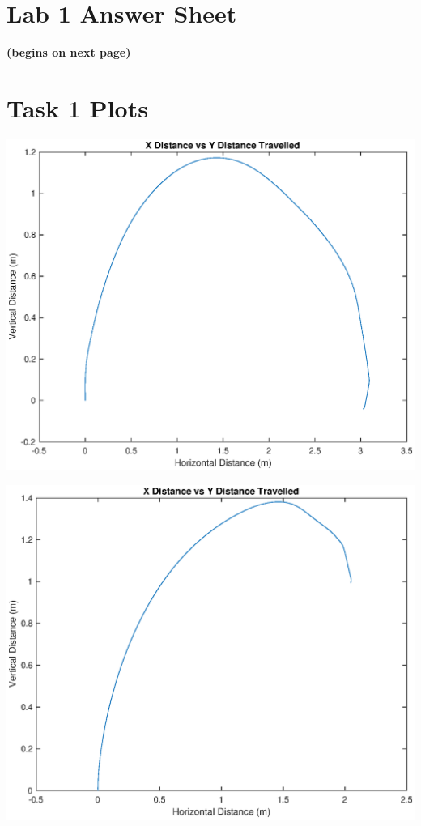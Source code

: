 \documentclass[10pt]{article}
\newcommand{\bigScale}{0.6}
\begin{document}
\pagebreak
\section{Lab 1 Answer Sheet}
\textbf{(begins on next page)}


\pagebreak
\section{Task 1 Plots}
\centering
\includegraphics[scale=\bigScale]{./figures/task1_x0_y3.eps}

\includegraphics[scale=\bigScale]{./figures/task1_x1y2.eps}
\end{document}
